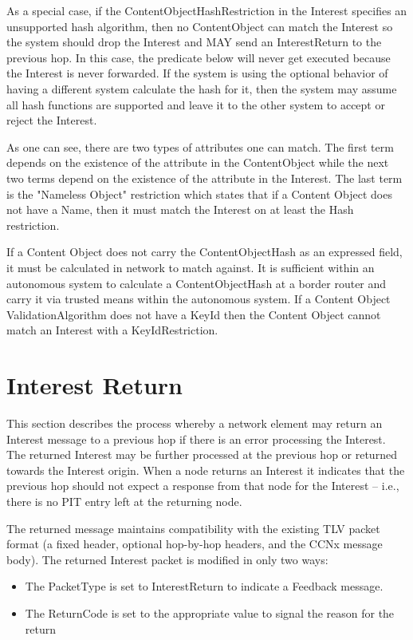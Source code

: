 \documentclass[12pt]{report}
\begin{document}
As a special case, if the ContentObjectHashRestriction in the
Interest specifies an unsupported hash algorithm, then no
ContentObject can match the Interest so the system should drop the
Interest and MAY send an InterestReturn to the previous hop.  In this
case, the predicate below will never get executed because the
Interest is never forwarded.  If the system is using the optional
behavior of having a different system calculate the hash for it, then
the system may assume all hash functions are supported and leave it
to the other system to accept or reject the Interest.


As one can see, there are two types of attributes one can match.  The
first term depends on the existence of the attribute in the
ContentObject while the next two terms depend on the existence of the
attribute in the Interest.  The last term is the "Nameless Object"
restriction which states that if a Content Object does not have a
Name, then it must match the Interest on at least the Hash
restriction.

If a Content Object does not carry the ContentObjectHash as an
expressed field, it must be calculated in network to match against.
It is sufficient within an autonomous system to calculate a
ContentObjectHash at a border router and carry it via trusted means
within the autonomous system.  If a Content Object
ValidationAlgorithm does not have a KeyId then the Content Object
cannot match an Interest with a KeyIdRestriction.

\section{Interest Return}
This section describes the process whereby a network element may
return an Interest message to a previous hop if there is an error
processing the Interest.  The returned Interest may be further
processed at the previous hop or returned towards the Interest
origin.  When a node returns an Interest it indicates that the
previous hop should not expect a response from that node for the
Interest -- i.e., there is no PIT entry left at the returning node.

The returned message maintains compatibility with the existing TLV
packet format (a fixed header, optional hop-by-hop headers, and the
CCNx message body).  The returned Interest packet is modified in only
two ways:

\begin{itemize}
\item  The PacketType is set to InterestReturn to indicate a Feedback
   message.

\item  The ReturnCode is set to the appropriate value to signal the
   reason for the return
\end{itemize}
\end{document}
